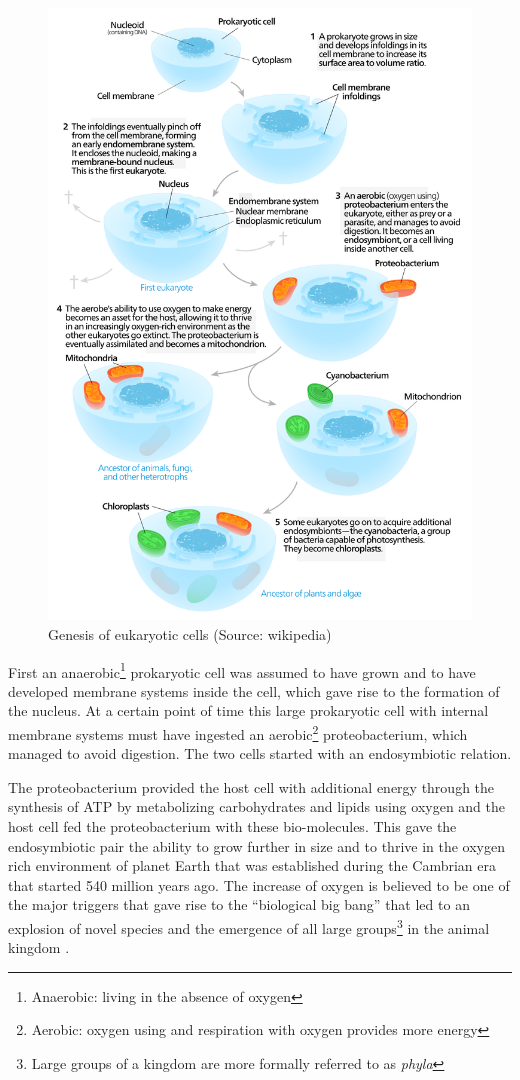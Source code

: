 \documentclass[
  11pt,
]{book}
\begin{document}
\begin{figure}

{\centering \includegraphics[width=0.8\linewidth]{./figs/endosymbiosis} 

}

\caption{Genesis of eukaryotic cells (Source: wikipedia)}\label{fig:endosymbiosis}
\end{figure}

First an anaerobic\footnote{Anaerobic: living in the absence of oxygen} prokaryotic cell was assumed to have grown and to have developed membrane systems inside the cell, which gave rise to the formation of the nucleus. At a certain point of time this large prokaryotic cell with internal membrane systems must have ingested an aerobic\footnote{Aerobic: oxygen using and respiration with oxygen provides more energy} proteobacterium, which managed to avoid digestion. The two cells started with an endosymbiotic relation.

The proteobacterium provided the host cell with additional energy through the synthesis of ATP by metabolizing carbohydrates and lipids using oxygen and the host cell fed the proteobacterium with these bio-molecules. This gave the endosymbiotic pair the ability to grow further in size and to thrive in the oxygen rich environment of planet Earth that was established during the Cambrian era that started 540 million years ago. The increase of oxygen is believed to be one of the major triggers that gave rise to the ``biological big bang'' that led to an explosion of novel species and the emergence of all large groups\footnote{Large groups of a kingdom are more formally referred to as \emph{phyla}} in the animal kingdom \citep{he2019}.
\end{document}
